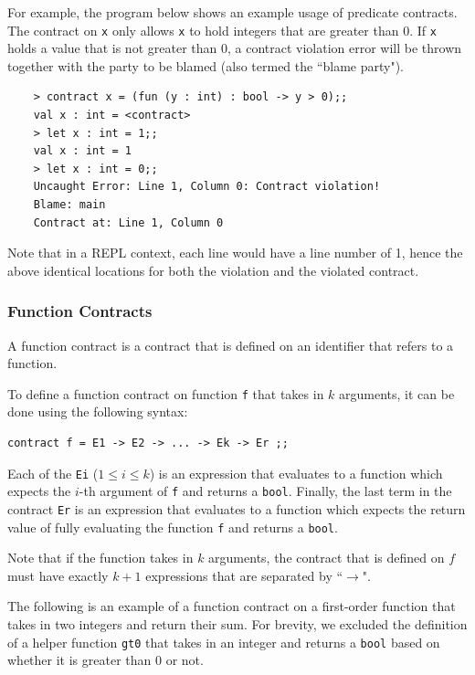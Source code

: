 \documentclass[a4paper]{article}
\begin{document}
For example, the program below shows an example usage of predicate contracts.
The contract on \texttt{x} only allows \texttt{x} to hold integers that are greater than 0.
If \texttt{x} holds a value that is not greater than 0, a contract violation error will be thrown together with the party to be blamed (also termed the ``blame party").

\begin{verbatim}
    > contract x = (fun (y : int) : bool -> y > 0);;
    val x : int = <contract>
    > let x : int = 1;;
    val x : int = 1
    > let x : int = 0;;
    Uncaught Error: Line 1, Column 0: Contract violation!
    Blame: main
    Contract at: Line 1, Column 0
\end{verbatim}

Note that in a REPL context, each line would have a line number of 1, hence the above identical locations for both the violation and the violated contract.

\subsubsection{Function Contracts}

A function contract is a contract that is defined on an identifier that refers to a function.

To define a function contract on function \texttt{f} that takes in $k$ arguments, it can be done using the following syntax:

\begin{verbatim}
contract f = E1 -> E2 -> ... -> Ek -> Er ;;
\end{verbatim}

Each of the \texttt{Ei} ($1 \leq i \leq k$) is an expression that evaluates to a function which expects the $i$-th argument of \texttt{f} and returns a \texttt{bool}.
Finally, the last term in the contract \texttt{Er} is an expression that evaluates to a function which expects the return value of fully evaluating the function \texttt{f} and returns a \texttt{bool}.

Note that if the function takes in $k$ arguments, the contract that is defined on $f$ must have exactly $k + 1$ expressions that are separated by ``$\rightarrow$".

The following is an example of a function contract on a first-order function that takes in two integers and return their sum.
For brevity, we excluded the definition of a helper function \texttt{gt0} that takes in an integer and returns a \texttt{bool} based on whether it is greater than 0 or not.
\end{document}
